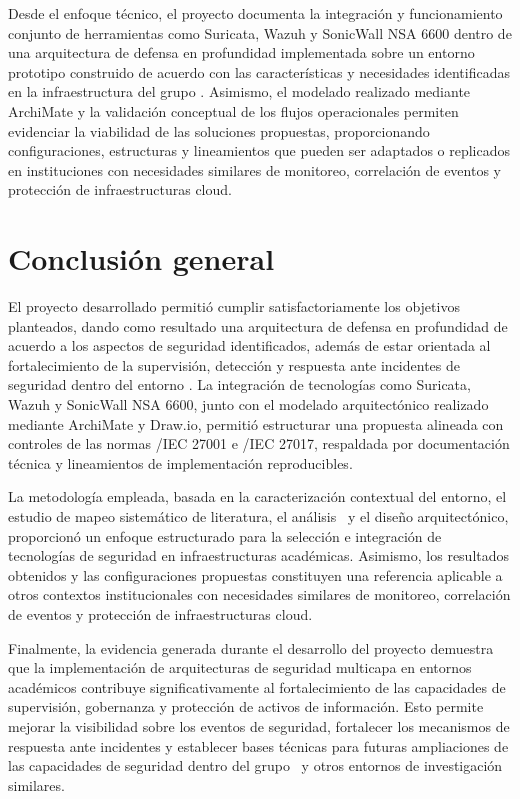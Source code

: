 Desde el enfoque técnico, el proyecto documenta la integración y funcionamiento conjunto de herramientas como Suricata, Wazuh y SonicWall 
NSA 6600 dentro de una arquitectura de defensa en profundidad implementada sobre un entorno prototipo construido de acuerdo con las 
características y necesidades identificadas en la infraestructura del grupo \GRID. Asimismo, el modelado realizado mediante ArchiMate y la 
validación conceptual de los flujos operacionales permiten evidenciar la viabilidad de las soluciones propuestas, proporcionando 
configuraciones, estructuras y lineamientos que pueden ser adaptados o replicados en instituciones con necesidades similares de monitoreo, 
correlación de eventos y protección de infraestructuras cloud.

\section{Conclusión general}
\noindent

El proyecto desarrollado permitió cumplir satisfactoriamente los objetivos planteados, dando como resultado una arquitectura de defensa en 
profundidad de acuerdo a los aspectos de seguridad identificados, además de estar orientada al fortalecimiento de la supervisión, 
detección y respuesta ante incidentes de seguridad dentro del entorno \GRID. La integración de tecnologías como Suricata, Wazuh y 
SonicWall NSA 6600, junto con el modelado arquitectónico realizado mediante ArchiMate y Draw.io, permitió estructurar una propuesta 
alineada con controles de las normas \ISO/IEC 27001 e \ISO/IEC 27017, respaldada por documentación técnica y lineamientos de implementación 
reproducibles.

La metodología empleada, basada en la caracterización contextual del entorno, el estudio de mapeo sistemático de literatura, el análisis 
\DAR\ y el diseño arquitectónico, proporcionó un enfoque estructurado para la selección e integración de tecnologías de seguridad en 
infraestructuras académicas. Asimismo, los resultados obtenidos y las configuraciones propuestas constituyen una referencia aplicable a 
otros contextos institucionales con necesidades similares de monitoreo, correlación de eventos y protección de infraestructuras cloud.

Finalmente, la evidencia generada durante el desarrollo del proyecto demuestra que la implementación de arquitecturas de seguridad 
multicapa en entornos académicos contribuye significativamente al fortalecimiento de las capacidades de supervisión, gobernanza y 
protección de activos de información. Esto permite mejorar la visibilidad sobre los eventos de seguridad, fortalecer los mecanismos de 
respuesta ante incidentes y establecer bases técnicas para futuras ampliaciones de las capacidades de seguridad dentro del grupo \GRID\ y 
otros entornos de investigación similares.
